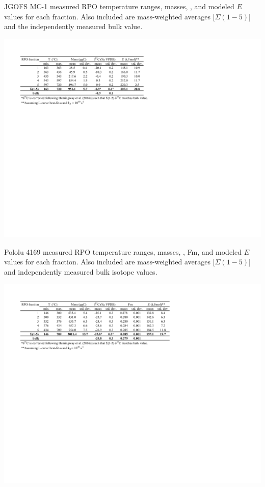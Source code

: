 \begin{table}
	\caption[JGOFS MC-1 RPO results]{JGOFS MC-1 measured RPO temperature ranges,  masses, , and modeled $E$ values for each fraction. Also included are mass-weighted averages [$\Sigma(1-5)$] and the independently measured bulk  value.}
	\centering
		\includegraphics{Thesis_Tables/Ch3Tab3}
	\label{Ch3Tab:3} 
\end{table}

\begin{table}
	\caption[Pololu 4169 RPO results]{Pololu 4169 measured RPO temperature ranges,  masses, , Fm, and modeled $E$ values for each fraction. Also included are mass-weighted averages [$\Sigma(1-5)$] and independently measured bulk isotope values.}
	\centering
		\includegraphics{Thesis_Tables/Ch3Tab4}
	\label{Ch3Tab:4} 
\end{table}

